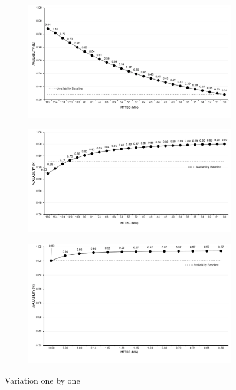 \documentclass[conference]{IEEEtran}
\begin{document}
\begin{figure}[htbp]
     \centering
     \begin{subfigure}[b]{0.45\textwidth}
         \includegraphics[width=\linewidth]{img/exps/SA_007.png}
         \caption{}
         \label{fig:ctmc_sa_bd}
     \end{subfigure}
     \hfill
     \begin{subfigure}[b]{0.45\textwidth}
         \centering
         \includegraphics[width=\linewidth]{img/exps/SA_001.png}
         \caption{}
         \label{fig:ctmc_sa_bc}
     \end{subfigure}
     \hfill
     \begin{subfigure}[b]{0.45\textwidth}
         \centering
         \includegraphics[width=\linewidth]{img/exps/SA_002.png}
         \caption{}
         \label{fig:ctmc_sa_suav}
     \end{subfigure}
        \caption{Variation one by one}
        \label{fig:ctmc_sa}
\end{figure}
\end{document}
